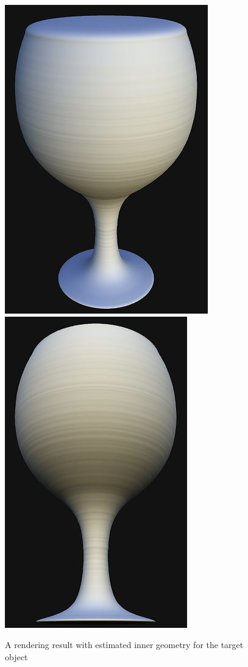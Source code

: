 \documentclass[10pt,twocolumn,letterpaper]{article}
\begin{document}
\begin{figure}
  \centering
	\includegraphics[height=0.7\linewidth]{figure/render_wine.JPG}	
	\includegraphics[height=0.7\linewidth]{figure/render_wine1.JPG}
  \caption{A rendering result with estimated inner geometry for the target object}
  \label{render}
\end{figure}

{\small


}
\end{document}
